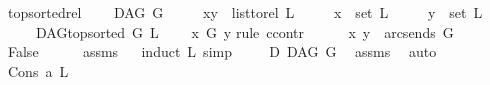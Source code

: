 \begin{isabellebody}
\isanewline
{}\isamarkupfalse%
\ top{\isacharunderscore}{\kern0pt}sorted{\isacharunderscore}{\kern0pt}rel{}{\isacharcolon}{\kern0pt}\ \isanewline
\ \ \ {\isachardoublequoteopen}DAG\ G{\isachardoublequoteclose}\isanewline
\ \ \ \ \ {\isachardoublequoteopen}{\isacharparenleft}{\kern0pt}x{\isacharcomma}{\kern0pt}y{\isacharparenright}{\kern0pt}\ {\isasymin}\ list{\isacharunderscore}{\kern0pt}to{\isacharunderscore}{\kern0pt}rel\ L{\isachardoublequoteclose}\isanewline
\ \ \ \ \ {\isachardoublequoteopen}x\ {\isasymin}\ set\ L{\isachardoublequoteclose}\isanewline
\ \ \ \ \ {\isachardoublequoteopen}y\ {\isasymin}\ set\ L{\isachardoublequoteclose}\isanewline
\ \ \ \ \ {\isachardoublequoteopen}DAG{\isachardot}{\kern0pt}top{\isacharunderscore}{\kern0pt}sorted\ G\ L{\isachardoublequoteclose}\isanewline
\ \ \ {\isachardoublequoteopen}{\isasymnot}\ x\ {\isasymrightarrow}\isactrlsup {\isacharplus}{\kern0pt}\isactrlbsub G\isactrlesub \ y{\isachardoublequoteclose}\isanewline
%
\isadelimproof
%
\endisadelimproof
%
\isatagproof
{}\isamarkupfalse%
{\isacharparenleft}{\kern0pt}rule\ ccontr{\isacharparenright}{\kern0pt}\isanewline
\ \ \isamarkupfalse%
\ {\isachardoublequoteopen}\ {\isasymnot}\ {\isacharparenleft}{\kern0pt}x{\isacharcomma}{\kern0pt}\ y{\isacharparenright}{\kern0pt}\ {\isasymnotin}\ {\isacharparenleft}{\kern0pt}arcs{\isacharunderscore}{\kern0pt}ends\ G{\isacharparenright}{\kern0pt}\isactrlsup {\isacharplus}{\kern0pt}{\isachardoublequoteclose}\isanewline
\ \ \isamarkupfalse%
\ \isamarkupfalse%
\ {\isachardoublequoteopen}False{\isachardoublequoteclose}\isanewline
\ \ \ \ \isamarkupfalse%
\ assms{\isacharparenleft}{\kern0pt}{}{\isacharcomma}{\kern0pt}{}{\isacharcomma}{\kern0pt}{}{\isacharcomma}{\kern0pt}{}{\isacharparenright}{\kern0pt}\isanewline
\ \ \isamarkupfalse%
{\isacharparenleft}{\kern0pt}induct\ L{\isacharcomma}{\kern0pt}\ simp{\isacharparenright}{\kern0pt}\isanewline
\ \ \ \isamarkupfalse%
\ D{\isacharcolon}{\kern0pt}\ DAG\ G\ \isamarkupfalse%
\ assms{\isacharparenleft}{\kern0pt}{}{\isacharparenright}{\kern0pt}\ \isamarkupfalse%
\ auto\isanewline
\ \ \ \isamarkupfalse%
\ {\isacharparenleft}{\kern0pt}Cons\ a\ L{\isacharparenright}{\kern0pt}\isanewline
\ \ \ \isamarkupfalse%
\ \isamarkupfalse%

\end{isabellebody}
